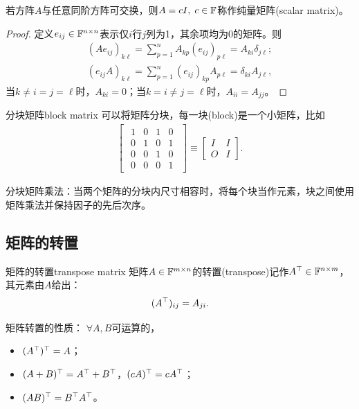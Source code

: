 \begin{theorem}{}{}
	若方阵$A$与任意同阶方阵可交换，则$A = cI,\;c \in \mathbb{F}$称作纯量矩阵(scalar matrix)。
\end{theorem}
\begin{proof}
	定义$e_{ij} \in \mathbb{F}^{n\times n}$表示仅$i$行$j$列为1，其余项均为0的矩阵。则
	\begin{subequations}\label{eq:la-matrix-unit-action}
		\begin{align}
			(Ae_{ij})_{k\ell} = \sum_{p=1}^nA_{kp}(e_{ij})_{p\ell} = A_{ki}\delta_{j\ell};\\
			(e_{ij}A)_{k\ell} = \sum_{p=1}^n(e_{ij})_{kp}A_{p\ell} = \delta_{ki}A_{j\ell},
		\end{align}
	\end{subequations}
	当$k \neq i = j = \ell$时，$A_{ki} = 0$；当$k = i \neq j = \ell$时，$A_{ii} = A_{jj}$。
\end{proof}
\begin{definition}{分块矩阵}{block matrix}
	可以将矩阵分块，每一块(block)是一个小矩阵，比如
	\begin{align*}
		\begin{bmatrix}
			\begin{array}{cc|cc}
				1&0&1&0\\
				0&1&0&1\\
				\hline
				0&0&1&0\\
				0&0&0&1	
			\end{array}
		\end{bmatrix}
		\equiv
		\begin{bmatrix}
			I&I\\O&I
		\end{bmatrix}.
	\end{align*}
\end{definition}

\begin{remark}
	分块矩阵乘法：当两个矩阵的分块内尺寸相容时，将每个块当作元素，块之间使用矩阵乘法并保持因子的先后次序。
\end{remark}

\subsection{矩阵的转置}

\begin{definition}{矩阵的转置}{transpose matrix}
	矩阵$A \in \mathbb{F}^{m\times n}$的转置(transpose)记作$A^\top \in \mathbb{F}^{n\times m}$，其元素由$A$给出：
	\begin{equation}\label{eq:la-transpose-entries}
		(A^\top)_{ij} = A_{ji}.
	\end{equation}
\end{definition}
\begin{corollary}
	矩阵转置的性质：%
	$\forall A,B$可运算的，
	\begin{itemize}
		\item $(A^\top)^\top = A$；
		\item $(A + B)^\top = A^\top + B^\top$，$(cA)^\top = cA^\top$；
		\item $(AB)^\top = B^\top A^\top$。
	\end{itemize}
\end{corollary}


